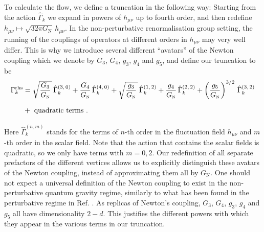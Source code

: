 \documentclass[11pt]{book} %
\newcommand\GNewton{ G_{\scriptscriptstyle{\mathrm{N}}} }
\numberwithin{equation}{chapter}
\begin{document}
To calculate the flow, we define a truncation in the following way:
Starting from the action $\hat\Gamma_k$ we expand in powers of $h_{\mu \nu}$ up to fourth order,
and then redefine $h_{\mu \nu} \mapsto \sqrt{32 \pi \GNewton} \, h_{\mu\nu}$.
In the non-perturbative renormalisation group setting,
the running of the couplings of operators at different orders in $h_{\mu \nu}$ may very well differ.
This is why we introduce several different ``avatars'' of the Newton coupling which we denote
by $G_3$, $G_4$, $g_3$, $g_4$ and $g_5$, and define our truncation to be
\begin{align}
  \Gamma_k^\mathrm{rhs} &=
  \sqrt{ \frac{G_3}{\GNewton} \, } \, \hat\Gamma^{(3,\,0)}_k
  + \frac{G_4}{\GNewton} \, \hat\Gamma^{(4,\,0)}_k
  + \sqrt{ \frac{g_3}{\GNewton} \, } \, \hat\Gamma^{(1,\,2)}_k
  + \frac{g_4}{ \GNewton} \, \hat\Gamma^{(2,\,2)}_k
  + \left(\frac{g_5}{ \GNewton}\right)^{3/2} \, \hat\Gamma^{(3,\,2)}_k \nonumber \\
  & + \vphantom{ \sqrt{\frac{g_3}{\GNewton}} }\mbox{ quadratic terms }.
  \label{gammarhs}
\end{align}
Here $\hat \Gamma^{(n,m)}_k$ stands for the terms of $n$-th order in the fluctuation field $h_{\mu \nu}$
and $m$-th order in the scalar field.
Note that the action that contains the scalar fields is quadratic,
so we only have terms with $m=0,2$.
Our redefinition of all separate prefactors of the different vertices allows us to explicitly distinguish
these avatars of the Newton coupling, instead of approximating them all by $\GNewton$.
One should not expect a universal definition of the Newton coupling to exist in the non-perturbative
quantum gravity regime, similarly to what has been found in the perturbative regime in
Ref. \cite{Anber:2011ut}.
As replicas of Newton's coupling, $G_3$, $G_4$, $g_3$, $g_4$ and $g_5$ all have dimensionality $2-d$.
This justifies the different powers with which they appear
in the various terms in our truncation.
\end{document}
